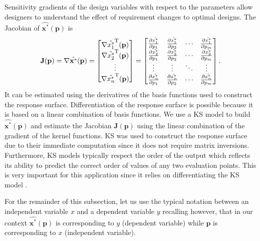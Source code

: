 Sensitivity gradients of the design variables with respect to the parameters allow designers to understand the effect of requirement changes to optimal designs.
The Jacobian of $\hat{\mathbf{x}^*}(\mathbf{p})$ is
\begin{equation}
	\mathbf{J}(\mathbf{p}) = \nabla\hat{\mathbf{x}^*}(\mathbf{p)} = \begin{bmatrix}
	 	\nabla\hat{x_1^*}^{\text T}(\mathbf{p}) \\ 
	 	\nabla\hat{x_2^*}^{\text T}(\mathbf{p}) \\ 
	 	\vdots \\ 
	 	\nabla\hat{x_n^*}^{\text T}(\mathbf{p})
	\end{bmatrix} = \begin{bmatrix}
	 	\frac{\partial \hat{x_1^*}}{\partial p_1} & \frac{\partial \hat{x_1^*}}{\partial p_2} & \cdots & \frac{\partial \hat{x_1^*}}{\partial p_m}\\ 
	 	\frac{\partial \hat{x_2^*}}{\partial p_1} & \frac{\partial \hat{x_2^*}}{\partial p_2} & \cdots & \frac{\partial \hat{x_2^*}}{\partial p_m}\\ 
	 	\vdots & \vdots & \ddots & \vdots\\ 
	 	\frac{\partial \hat{x_n^*}}{\partial p_1} & \frac{\partial \hat{x_n^*}}{\partial p_2} & \cdots & \frac{\partial \hat{x_n^*}}{\partial p_m}\\ 
	\end{bmatrix}.
	 \label{eq:jacobian}
\end{equation}
It can be estimated using the derivatives of the basis functions used to construct the response surface. Differentiation of the response surface is possible because it is based on a linear combination of basis functions. We use a \acf{KS} model to build  $\hat{\mathbf{x}^*}(\mathbf{p})$ and estimate the Jacobian $\mathbf{J}(\mathbf{p})$ using the linear combination of the gradient of the kernel functions. \ac{KS} was used to construct the response surface due to their immediate computation since it does not require matrix inversions. Furthermore, \ac{KS} models typically respect the order of the output which reflects its ability to predict the correct order of values of any two evaluation points. This is very important for this application since it relies on differentiating the KS model \cite{Audet2018}.

For the remainder of this subsection, let us use the typical notation between an independent variable $x$ and a dependent variable $y$ recalling however, that in our context $\hat{\mathbf{x}^*}(\mathbf{p})$ is corresponding to $y$ (dependent variable) while $\mathbf{p}$ is corresponding to $x$ (independent variable).

